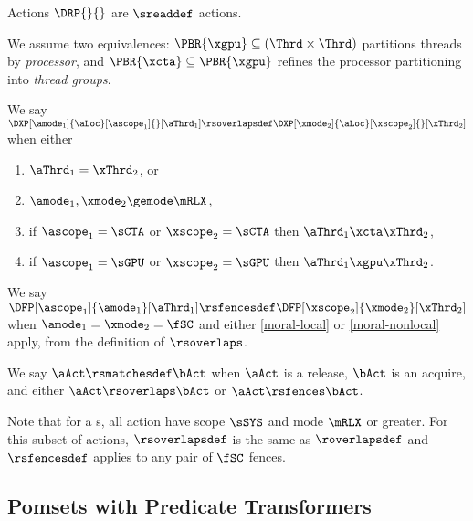 Actions $\DRP{}{}$ are $\sreaddef$ actions.

\begin{definition}
  We assume two equivalences:
  $\PBR{\xgpu}\subseteq(\Thrd\times\Thrd)$ partitions threads by
  \emph{processor}, and $\PBR{\xcta}\subseteq\PBR{\xgpu}$ refines the processor
  partitioning into \emph{thread groups}.
  
  We say
  $\DXP[\amode_1]{\aLoc}[\ascope_1]{}[\aThrd_1] \rsoverlapsdef
  \DXP[\xmode_2]{\aLoc}[\xscope_2]{}[\xThrd_2]$ when %
  either
  \begin{multicols}{2}
    \begin{enumerate}[,label=(2\alph*),ref=2\alph*]      
    \item[{\labeltext[1]{(1)}{moral-local}}]
    $\aThrd_1=\xThrd_2$, or
    \item $\amode_1,\xmode_2\gemode\mRLX$,
    \item if $\ascope_1=\sCTA$ or $\xscope_2=\sCTA$ then $\aThrd_1\xcta\xThrd_2$, %
    \item if $\ascope_1=\sGPU$ or $\xscope_2=\sGPU$ then $\aThrd_1\xgpu\xThrd_2$.
    \end{enumerate}
  \end{multicols}
  \smallskip

  We say
  $\DFP[\ascope_1]{\amode_1}[\aThrd_1] \rsfencesdef \DFP[\xscope_2]{\xmode_2}[\xThrd_2]$
  when $\amode_1=\xmode_2=\fSC$ and either \eqref{moral-local} or
  \eqref{moral-nonlocal} apply, from the definition of $\rsoverlaps$.

  We say $\aAct \rsmatchesdef \bAct$ when $\aAct$ is a release, $\bAct$ is an
  acquire, and either $\aAct\rsoverlaps \bAct$ or $\aAct\rsfences \bAct$.

\end{definition}

Note that for a \CPU{}s, all action have scope $\sSYS$ and mode $\mRLX$ or
greater.  For this subset of actions, $\rsoverlapsdef$ is the same as
$\roverlapsdef$ and $\rsfencesdef$ applies to any pair of $\fSC$ fences.






\subsection{Pomsets with Predicate Transformers}
\label{sec:pomsets}

